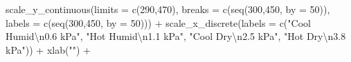 \documentclass[
]{article}
\newenvironment{Shaded}{\begin{snugshade}}{\end{snugshade}}
\newcommand{\AttributeTok}[1]{\textcolor[rgb]{0.77,0.63,0.00}{#1}}
\newcommand{\DecValTok}[1]{\textcolor[rgb]{0.00,0.00,0.81}{#1}}
\newcommand{\FunctionTok}[1]{\textcolor[rgb]{0.00,0.00,0.00}{#1}}
\newcommand{\NormalTok}[1]{#1}
\newcommand{\SpecialCharTok}[1]{\textcolor[rgb]{0.00,0.00,0.00}{#1}}
\newcommand{\StringTok}[1]{\textcolor[rgb]{0.31,0.60,0.02}{#1}}
\begin{document}
\begin{Shaded}
\begin{Highlighting}[]
  \FunctionTok{scale\_y\_continuous}\NormalTok{(}\AttributeTok{limits =} \FunctionTok{c}\NormalTok{(}\DecValTok{290}\NormalTok{,}\DecValTok{470}\NormalTok{),}
                     \AttributeTok{breaks =} \FunctionTok{c}\NormalTok{(}\FunctionTok{seq}\NormalTok{(}\DecValTok{300}\NormalTok{,}\DecValTok{450}\NormalTok{, }\AttributeTok{by =} \DecValTok{50}\NormalTok{)),}
                     \AttributeTok{labels =} \FunctionTok{c}\NormalTok{(}\FunctionTok{seq}\NormalTok{(}\DecValTok{300}\NormalTok{,}\DecValTok{450}\NormalTok{, }\AttributeTok{by =} \DecValTok{50}\NormalTok{))) }\SpecialCharTok{+}
  \FunctionTok{scale\_x\_discrete}\NormalTok{(}\AttributeTok{labels =} \FunctionTok{c}\NormalTok{(}\StringTok{"Cool Humid}\SpecialCharTok{\textbackslash{}n}\StringTok{0.6 kPa"}\NormalTok{,}
                               \StringTok{"Hot Humid}\SpecialCharTok{\textbackslash{}n}\StringTok{1.1 kPa"}\NormalTok{,}
                               \StringTok{"Cool Dry}\SpecialCharTok{\textbackslash{}n}\StringTok{2.5 kPa"}\NormalTok{,}
                               \StringTok{"Hot Dry}\SpecialCharTok{\textbackslash{}n}\StringTok{3.8 kPa"}\NormalTok{)) }\SpecialCharTok{+} 
  \FunctionTok{xlab}\NormalTok{(}\StringTok{""}\NormalTok{) }\SpecialCharTok{+} 
  

\end{Highlighting}
\end{Shaded}
\end{document}

